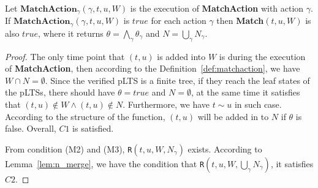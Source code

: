\documentclass[a4paper,UKenglish,cleveref, autoref]{lipics-v2019}
\begin{document}
\begin{proposition}Let $\textbf{MatchAction}_\gamma(\gamma,t,u,W)$ is the execution of \textbf{MatchAction} with action $\gamma$.
If $\textbf{MatchAction}_\gamma(\gamma,t,u,W)$ is $true$ for each action $\gamma$ then \textbf{Match}$(t,u,W)$ is also $true$, where it returns $\theta=\bigwedge_\gamma\theta_\gamma$ and $N=\bigcup_\gamma N_\gamma$.
\end{proposition}
\begin{proof}
The only time point that $(t,u)$ is added into $W$ is during the execution of \textbf{MatchAction}, then according to the Definition~\ref{def:matchaction}, we have $W\cap N=\emptyset$. Since the verified pLTS is a finite tree, if they reach the leaf states of the pLTSs, there should have $\theta=true$ and $N=\emptyset$, at the same time it satisfies that $(t,u)\notin W\wedge(t,u)\notin N$. Furthermore, we have $t\sim u$ in such case. According to the structure of the function, $(t,u)$ will be added in to $N$ if $\theta$ is false. Overall, $C1$ is satisfied.

From condition (M2) and (M3), \texttt{R}$(t,u,W,N_{\gamma})$ exists. According to Lemma~\ref{lem:n_merge}, we have the condition that \texttt{R}$(t,u,W,\bigcup_{\gamma}N_{\gamma})$, it satisfies $C2$.
\end{proof}
\end{document}
